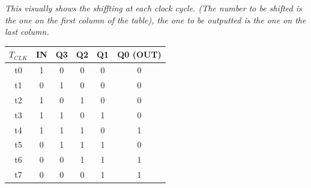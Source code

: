 \documentclass[12pt,openany]{book}
\begin{document}
\newpage
\textit{This visually shows the shiffting at each clock cycle. (The number to be shifted is the one on the first column of the table), the one to be outputted is the one on the last column.}
\begin{table}[h]
    \centering
    \begin{tabular}{|c|c|c|c|c|c|}
        \hline
        $T_{CLK}$ & IN & Q3 & Q2 & Q1 & Q0 (OUT) \\ \hline
        t0 & 1 & 0 & 0 & 0 & 0 \\ \hline
        t1 & 0 & 1 & 0 & 0 & 0 \\ \hline
        t2 & 1 & 0 & 1 & 0 & 0 \\ \hline
        t3 & 1 & 1 & 0 & 1 & 0 \\ \hline
        t4 & 1 & 1 & 1 & 0 & 1 \\ \hline
        t5 & 0 & 1 & 1 & 1 & 0 \\ \hline
        t6 & 0 & 0 & 1 & 1 & 1 \\ \hline
        t7 & 0 & 0 & 0 & 1 & 1 \\ \hline
    \end{tabular}
\end{table}
\end{document}
